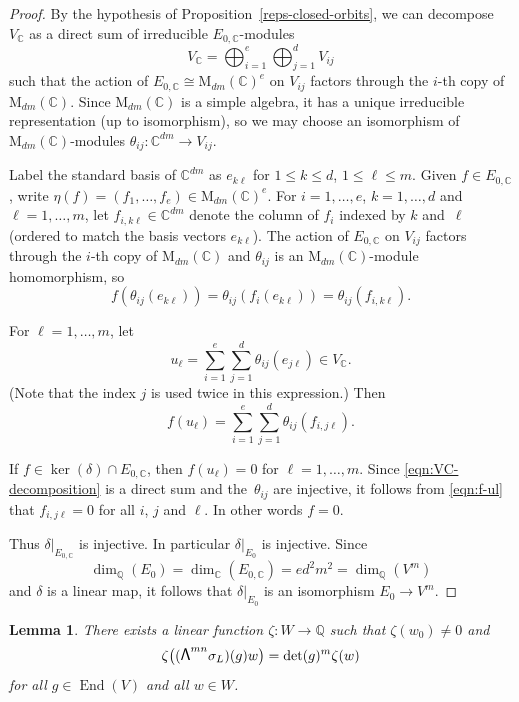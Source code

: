 \documentclass[JEP,XML,SOM,Unicode,NoFloatCountersInSection]{cedram}
\newcommand\bw{{\hbox{\large$\mathsf{\Lambda}$}}}
\newcommand{\bC}{\mathbb{C}}
\newcommand{\bQ}{\mathbb{Q}}
\newcommand{\rM}{\mathrm{M}}
\DeclareMathOperator{\End}{End}
\let\extpower\bw
\newtheorem{lemma}{Lemma}[section]
\begin{document}
\begin{proof}
By the hypothesis of Proposition~\ref{reps-closed-orbits}, we can decompose $V_\bC$ as a direct sum of irreducible $E_{0,\bC}$-modules
\begin{equation} \label{eqn:VC-decomposition}
V_\bC = \bigoplus_{i=1}^e \bigoplus_{j=1}^d V_{ij}
\end{equation}
such that the action of $E_{0,\bC} \cong \rM_{dm}(\bC)^e$ on $V_{ij}$ factors through the $i$-th copy of $\rM_{dm}(\bC)$.
Since $\rM_{dm}(\bC)$ is a simple algebra, it has a unique irreducible representation (up to isomorphism), so we may choose an isomorphism of $\rM_{dm}(\bC)$-modules $\theta_{ij} \colon \bC^{dm} \to V_{ij}$.

Label the standard basis of $\bC^{dm}$ as $e_{k\ell}$ for $1 \leq k \leq d$, $1 \leq \ell \leq m$.
Given $f \in E_{0,\bC}$, write $\eta(f) = (f_1, \dotsc, f_e) \in \rM_{dm}(\bC)^e$.
For $i = 1, \dotsc, e$, $k = 1, \dotsc, d$ and $\ell = 1, \dotsc, m$, let $f_{i,k\ell} \in \bC^{dm}$ denote the column of $f_i$ indexed by $k$ and~$\ell$ (ordered to match the basis vectors $e_{k\ell}$).
The action of $E_{0,\bC}$ on $V_{ij}$ factors through the $i$-th copy of $\rM_{dm}(\bC)$ and $\theta_{ij}$ is an $\rM_{dm}(\bC)$-module homomorphism, so
\[
f(\theta_{ij}(e_{k\ell})) = \theta_{ij}(f_i(e_{k\ell})) = \theta_{ij}(f_{i,k\ell}).
\]

For $\ell = 1, \dotsc, m$, let
\[
u_\ell = \sum_{i=1}^e \sum_{j=1}^d \theta_{ij}(e_{j\ell}) \in V_\bC.
\]
(Note that the index $j$ is used twice in this expression.)
Then
\begin{equation} \label{eqn:f-ul}
f(u_\ell) = \sum_{i=1}^e \sum_{j=1}^d \theta_{ij}(f_{i,j\ell}).
\end{equation}

If $f \in \ker(\delta) \cap E_{0,\bC}$, then $f(u_\ell) = 0$ for $\ell = 1, \dotsc, m$.
Since \eqref{eqn:VC-decomposition} is a direct sum and the~$\theta_{ij}$ are injective, it follows from \eqref{eqn:f-ul} that $f_{i,j\ell} = 0$ for all $i$, $j$ and $\ell$. In other words $f=0$.

Thus $\delta|_{E_{0,\bC}}$ is injective. In particular $\delta|_{E_0}$ is injective.
Since
\[
\dim_\bQ(E_0) = \dim_\bC(E_{0,\bC}) = ed^2m^2 = \dim_\bQ(V^m)
\]
and $\delta$ is a linear map, it follows that $\delta|_{E_0}$ is an isomorphism $E_0 \to V^m$.
\end{proof}

\begin{lemma}
There exists a linear function $\zeta \colon W \to \bQ$ such that $\zeta(w_0) \neq 0$ and
\[
\zeta \bigl( (\extpower^{mn} \sigma_L)(g)w \bigr) = \det(g)^m \zeta(w)
\]
for all $g \in \End(V)$ and all $w \in W$.
\end{lemma}
\end{document}
